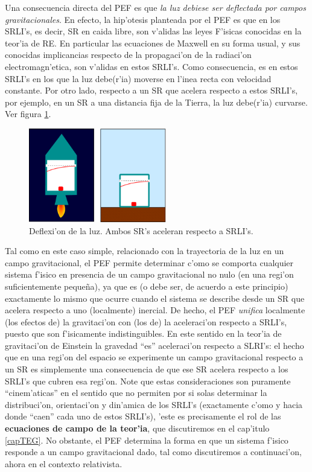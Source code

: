 Una consecuencia directa del PEF es que \textit{la luz debiese ser deflectada por campos gravitacionales}. En efecto, la hip'otesis planteada por el PEF es que en los SRLI's, es decir, SR en caida libre, son v'alidas las leyes F'isicas conocidas en la teor'ia de RE. En particular las ecuaciones de Maxwell en su forma usual, y sus conocidas implicancias respecto de la propagaci'on de la radiaci'on electromagn'etica, son v'alidas en estos SRLI's. Como consecuencia, es en estos SRLI's en los que la luz debe(r'ia) moverse en l'inea recta con velocidad constante. 
 Por otro lado, respecto a un SR que acelera respecto a estos SRLI's, por ejemplo, en un SR a una distancia fija de la Tierra, la luz debe(r'ia) curvarse. Ver figura \ref{fig:PEF-luz}.
\begin{figure}[H]
\centering\includegraphics[width=6cm]{fig/fig-gravedad-y-aceleracion-luz.pdf}
\caption{Deflexi'on de la luz. Ambos SR's aceleran respecto a SRLI's.}
\label{fig:PEF-luz}
\end{figure}
Tal como en este caso simple, relacionado con la trayectoria de la luz en un campo gravitacional, el PEF permite determinar c'omo se comporta cualquier sistema f'isico en presencia de un campo gravitacional no nulo (en una regi'on suficientemente peque\~na), ya que es (o debe ser, de acuerdo a este principio) exactamente lo mismo que ocurre cuando el sistema se describe desde un SR que acelera respecto a uno (localmente) inercial. De hecho, el PEF \textit{unifica} localmente (los efectos de) la gravitaci'on con (los de) la aceleraci'on respecto a SRLI's, puesto que son f'isicamente indistinguibles. En este sentido en la teor'ia de gravitaci'on de Einstein la gravedad ``es'' aceleraci'on respecto a SLRI's: el hecho que en una regi'on del espacio se experimente un campo gravitacional respecto a un SR es simplemente una consecuencia de que ese SR acelera respecto a los SRLI's que cubren esa regi'on. Note que estas consideraciones son puramente ``cinem'aticas'' en el sentido que no permiten por si solas determinar la distribuci'on, orientaci'on y din'amica de los SRLI's (exactamente c'omo y hacia donde ``caen'' cada uno de estos SRLI's), 'este es precisamente el rol de las \textbf{ecuaciones de campo de la teor'ia}, que discutiremos en el cap'itulo \ref{capTEG}. No obstante, el PEF determina la forma en que un sistema f'isico responde a un campo gravitacional dado, tal como discutiremos a continuaci'on, ahora en el contexto relativista.

